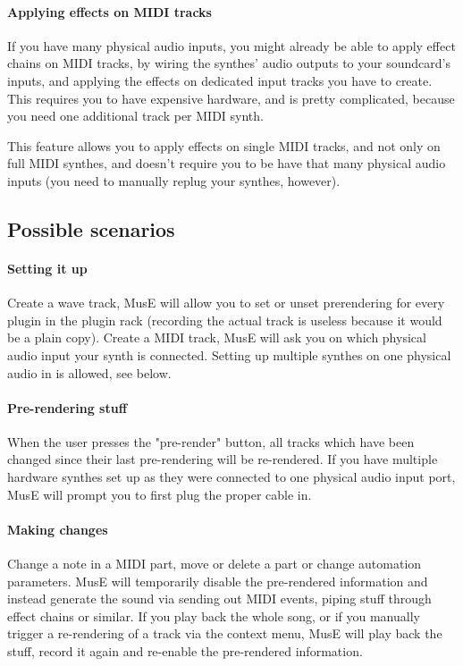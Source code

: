 \documentclass[a4paper]{report}
\begin{document}
\paragraph{Applying effects on MIDI tracks}
If you have many physical audio inputs, you might already be able to
apply effect chains on MIDI tracks, by wiring the synthes' audio
outputs to your soundcard's inputs, and applying the effects on
dedicated input tracks you have to create. This requires you to have
expensive hardware, and is pretty complicated, because you need one
additional track per MIDI synth.

This feature allows you to apply effects on single MIDI tracks, and not
only on full MIDI synthes, and doesn't require you to be have that
many physical audio inputs (you need to manually replug your synthes,
however).

\subsection{Possible scenarios}
\paragraph{Setting it up}
Create a wave track, MusE will allow you to set or unset prerendering
for every plugin in the plugin rack (recording the actual track is
useless because it would be a plain copy).
Create a MIDI track, MusE will ask you on which physical audio input
your synth is connected. Setting up multiple synthes on one physical 
audio in is allowed, see below.

\paragraph{Pre-rendering stuff}
When the user presses the "pre-render" button, all tracks which have
been changed since their last pre-rendering will be re-rendered.
If you have multiple hardware synthes set up as they were connected
to one physical audio input port, MusE will prompt you to first plug
the proper cable in.

\paragraph{Making changes}
Change a note in a MIDI part, move or delete a part or change automation
parameters. MusE will temporarily disable the pre-rendered information
and instead generate the sound via sending out MIDI events, piping stuff
through effect chains or similar. If you play back the whole song, or
if you manually trigger a re-rendering of a track via the context menu,
MusE will play back the stuff, record it again and re-enable the
pre-rendered information.
\end{document}
